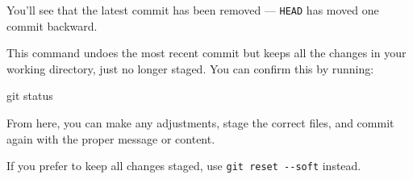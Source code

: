 \documentclass[
  11pt,
  letterpaper,
  DIV=11,
  numbers=noendperiod]{scrartcl}
\newenvironment{Shaded}{\begin{snugshade}}{\end{snugshade}}
\newcommand{\FunctionTok}[1]{\textcolor[rgb]{0.28,0.35,0.67}{#1}}
\newcommand{\NormalTok}[1]{\textcolor[rgb]{0.00,0.23,0.31}{#1}}
\let\textttOrig\texttt
\renewcommand{\texttt}[1]{\textttOrig{\colorbox{codebggray}{\textcolor{codefontcolor}{#1}}}}
\begin{document}
You'll see that the latest commit has been removed --- \texttt{HEAD} has
moved one commit backward.

This command undoes the most recent commit but keeps all the changes in
your working directory, just no longer staged. You can confirm this by
running:

\begin{Shaded}
\begin{Highlighting}[]
\FunctionTok{git}\NormalTok{ status}
\end{Highlighting}
\end{Shaded}

From here, you can make any adjustments, stage the correct files, and
commit again with the proper message or content.

\begin{tcolorbox}[enhanced jigsaw, opacityback=0, coltitle=black, bottomrule=.15mm, opacitybacktitle=0.6, breakable, colbacktitle=quarto-callout-tip-color!10!white, title=\textcolor{quarto-callout-tip-color}{\faLightbulb}\hspace{0.5em}{Tip}, left=2mm, rightrule=.15mm, toprule=.15mm, leftrule=.75mm, bottomtitle=1mm, toptitle=1mm, colback=white, titlerule=0mm, arc=.35mm, colframe=quarto-callout-tip-color-frame]

If you prefer to keep all changes staged, use
\texttt{git\ reset\ -\/-soft} instead.

\end{tcolorbox}
\end{document}
